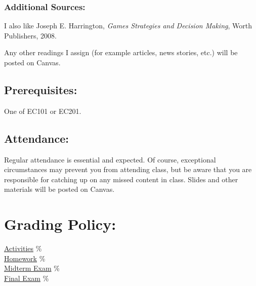 \subsubsection*{Additional Sources:}

  I also like Joseph E. Harrington, \textit{Games Strategies and Decision Making}, Worth Publishers, 2008.

 \noindent Any other readings I assign (for example articles, news stories, etc.) will be posted on Canvas.

\subsection*{Prerequisites:}

  One of EC101 or EC201.

\subsection*{Attendance:}

  Regular attendance is essential and expected.
  Of course, exceptional circumstances may prevent you from attending class, but be aware that you are responsible for catching up on any missed content in class.
  Slides and other materials will be posted on Canvas.

\section{Grading Policy:} 

\begin{center}\begin{minipage}{3.8in}\begin{flushleft}
    \hyperlink{grading_activity}{Activities} \% \\
    \hyperlink{grading_HW}{Homework}         \% \\
    \hyperlink{grading_exam}{Midterm Exam}   \% \\
    \hyperlink{grading_exam}{Final Exam}     \% \\
\end{flushleft}\end{minipage}\end{center}


